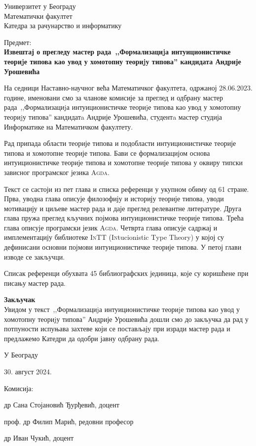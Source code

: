 \documentclass{letter}
\begin{document}
Универзитет у Београду\\
Математички факултет\\
Катедра за рачунарство и информатику

\vspace{1cm}

Предмет:\\
\textbf{Извештај о прегледу мастер рада~,,Формализациjа интуиционистичке теориjе типова као увод у хомотопну теориjу типова'' кандидата Андрије Урошевића}

\vspace{0.6cm}

На седници Наставно-научног већа Математичког факултета, одржаној 28.06.2023. године, именовани смо за чланове комисије за преглед и одбрану мастер рада~,,Формализациjа интуиционистичке теориjе типова као увод у хомотопну теориjу типова'' кандидатa Андрије Урошевића, студентa мастер студија Информатике на Математичком факултету.

\vspace{0.4cm}

Рад припада области теорије типова и подобласти интуиционистичке теорије типова и хомотопне теорије типова. Бави се формализацијом основа интуиционистичке теорије типова и хомотопне теорије типова у оквиру типски зависног програмског језика \textsc{Agda}.

Текст се састоји из пет глава и списка референци у укупном обиму од 61 стране. Прва, уводна глава описује филозофију и историју теорије типова, уводи мотивацију и циљеве мастер рада и даје преглед релевантне литературе. Друга глава пружа преглед кључних појмова интуиционистичке теорије типова. Трећа глава описује програмски језик \textsc{Agda}. Четврта глава описује садржај и имплементацију библиотеке \textsc{InTT} (\textsc{In}tucionistic \textsc{T}ype \textsc{T}heory) у којој су дефинисани основни појмови интуиционистичке теорије типова. У петој глави изводе се закључци.

Списак референци обухвата 45 библиографских јединица, које су коришћене при писању мастер рада.

\vspace{0.4cm}

\textbf{Закључак}\\
Увидом у текст~,,Формализациjа интуиционистичке теориjе типова као увод у хомотопну теориjу типова'' Андрије Урошевића дошли смо до закључка да рад у потпуности испуњава захтеве који се постављају при изради мастер рада и предлажемо Катедри да одобри јавну одбрану рада.

\vspace{1.0cm}

У Београду

30. август 2024.

\vspace{0.5cm}

Комисија:

др Сана Стојановић Ђурђевић, доцент

проф. др Филип Марић, редовни професор

др Иван Чукић, доцент
\end{document}
